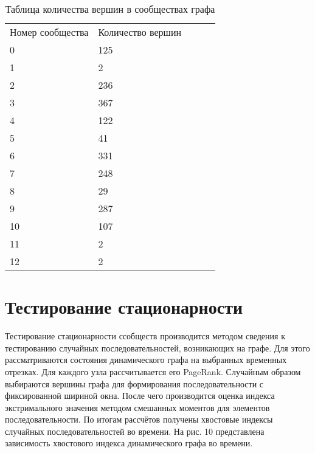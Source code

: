 \documentclass[reprint, amsmath, amssymb, aps,]{revtex4-2}
\begin{document}
\begin{table}[h!]
\begin{tabular}{|l|l|lll}
\cline{1-2}
Номер сообщества & Количество вершин &  &  &  \\ \cline{1-2}
0                & 125               &  &  &  \\ \cline{1-2}
1                & 2                 &  &  &  \\ \cline{1-2}
2                & 236               &  &  &  \\ \cline{1-2}
3                & 367               &  &  &  \\ \cline{1-2}
4                & 122               &  &  &  \\ \cline{1-2}
5                & 41                &  &  &  \\ \cline{1-2}
6                & 331               &  &  &  \\ \cline{1-2}
7                & 248               &  &  &  \\ \cline{1-2}
8                & 29                &  &  &  \\ \cline{1-2}
9                & 287               &  &  &  \\ \cline{1-2}
10               & 107               &  &  &  \\ \cline{1-2}
11               & 2                 &  &  &  \\ \cline{1-2}
12               & 2                 &  &  &  \\ \cline{1-2}

\end{tabular}
\caption {Таблица количества вершин в сообществах графа}
\end{table}




\section{Тестирование стационарности}

Тестирование стационарности ссобществ производится методом сведения к тестированию случайных последовательностей, возникающих на графе. Для этого рассматриваются состояния динамического графа на выбранных временных отрезках. Для каждого узла рассчитывается его PageRank. Случайным образом выбираются вершины графа для формирования последовательности с фиксированной шириной окна. После чего производится оценка индекса экстримального значения методом смешанных моментов для элементов последовательности. По итогам рассчётов получены хвостовые индексы случайных последовательностей во времени. 
На рис. 10 представлена зависимость хвостового индекса динамического графа во времени.
\end{document}
